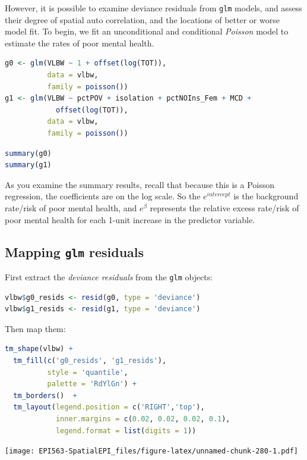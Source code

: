 \documentclass[
]{book}
\newcommand{\passthrough}[1]{#1}
\begin{document}
However, it is possible to examine deviance residuals from \passthrough{\lstinline!glm!} models, and assess their degree of spatial auto correlation, and the locations of better or worse model fit. To begin, we fit an unconditional and conditional \emph{Poisson} model to estimate the rates of poor mental health.

\begin{lstlisting}[language=R]
g0 <- glm(VLBW ~ 1 + offset(log(TOT)), 
          data = vlbw,
          family = poisson())
g1 <- glm(VLBW ~ pctPOV + isolation + pctNOIns_Fem + MCD +
            offset(log(TOT)), 
          data = vlbw,
          family = poisson())
\end{lstlisting}

\begin{lstlisting}[language=R]
summary(g0)
summary(g1)
\end{lstlisting}

As you examine the summary results, recall that because this is a Poisson regression, the coefficients are on the log scale. So the \(e^{intercept}\) is the background rate/risk of poor mental health, and \(e^\beta\) represents the relative excess rate/risk of poor mental health for each 1-unit increase in the predictor variable.

\hypertarget{mapping-glm-residuals}{%
\subsection{\texorpdfstring{Mapping \texttt{glm} residuals}{Mapping glm residuals}}\label{mapping-glm-residuals}}

First extract the \emph{deviance residuals} from the \passthrough{\lstinline!glm!} objects:

\begin{lstlisting}[language=R]
vlbw$g0_resids <- resid(g0, type = 'deviance')
vlbw$g1_resids <- resid(g1, type = 'deviance')
\end{lstlisting}

Then map them:

\begin{lstlisting}[language=R]
tm_shape(vlbw) +
  tm_fill(c('g0_resids', 'g1_resids'),
          style = 'quantile',
          palette = 'RdYlGn') +
  tm_borders()  +
  tm_layout(legend.position = c('RIGHT','top'),
            inner.margins = c(0.02, 0.02, 0.02, 0.1),
            legend.format = list(digits = 1))
\end{lstlisting}

\texttt{[image: EPI563-SpatialEPI\_files/figure-latex/unnamed-chunk-280-1.pdf]}
\end{document}
